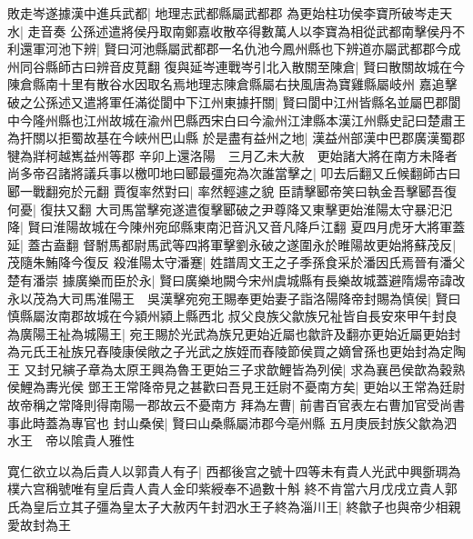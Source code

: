 敗走岑遂據漢中進兵武都|{
	地理志武都縣屬武都郡}
為更始柱功侯李寶所破岑走天水|{
	走音奏}
公孫述遣將侯丹取南鄭嘉收散卒得數萬人以李寶為相從武都南擊侯丹不利還軍河池下辨|{
	賢曰河池縣屬武都郡一名仇池今鳳州縣也下辨道亦屬武都郡今成州同谷縣師古曰辨音皮莧翻}
復與延岑連戰岑引北入散關至陳倉|{
	賢曰散關故城在今陳倉縣南十里有散谷水因取名焉地理志陳倉縣屬右抉風唐為寶雞縣屬岐州}
嘉追擊破之公孫述又遣將軍任滿從閬中下江州東據扞關|{
	賢曰閬中江州皆縣名並屬巴郡閬中今隆州縣也江州故城在渝州巴縣西宋白曰今渝州江津縣本漢江州縣史記曰楚肅王為扞關以拒蜀故基在今峽州巴山縣}
於是盡有益州之地|{
	漢益州部漢中巴郡廣漢蜀郡犍為牂柯越嶲益州等郡}
辛卯上還洛陽　三月乙未大赦　更始諸大將在南方未降者尚多帝召諸將議兵事以檄叩地曰郾最彊宛為次誰當擊之|{
	叩去后翻又丘候翻師古曰郾一戰翻宛於元翻}
賈復率然對曰|{
	率然輕遽之貌}
臣請擊郾帝笑曰執金吾擊郾吾復何憂|{
	復扶又翻}
大司馬當擊宛遂遣復擊郾破之尹尊降又東擊更始淮陽太守暴汜汜降|{
	賢曰淮陽故城在今陳州宛邱縣東南汜音汎又音凡降戶江翻}
夏四月虎牙大將軍蓋延|{
	蓋古盍翻}
督駙馬都尉馬武等四將軍擊劉永破之遂圍永於睢陽故更始將蘇茂反|{
	茂隨朱鮪降今復反}
殺淮陽太守潘蹇|{
	姓譜周文王之子季孫食采於潘因氏焉晉有潘父楚有潘崇}
據廣樂而臣於永|{
	賢曰廣樂地闕今宋州虞城縣有長樂故城蓋避隋煬帝諱改}
永以茂為大司馬淮陽王　吳漢擊宛宛王賜奉更始妻子詣洛陽降帝封賜為慎侯|{
	賢曰慎縣屬汝南郡故城在今潁州潁上縣西北}
叔父良族父歙族兄祉皆自長安來甲午封良為廣陽王祉為城陽王|{
	宛王賜於光武為族兄更始近屬也歙許及翻亦更始近屬更始封為元氏王祉族兄舂陵康侯敞之子光武之族姪而舂陵節侯買之嫡曾孫也更始封為定陶王}
又封兄縯子章為太原王興為魯王更始三子求歆鯉皆為列侯|{
	求為襄邑侯歆為穀熟侯鯉為夀光侯}
鄧王王常降帝見之甚歡曰吾見王廷尉不憂南方矣|{
	更始以王常為廷尉故帝稱之常降則得南陽一郡故云不憂南方}
拜為左曹|{
	前書百官表左右曹加官受尚書事此時蓋為專官也}
封山桑侯|{
	賢曰山桑縣屬沛郡今亳州縣}
五月庚辰封族父歙為泗水王　帝以隂貴人雅性

寛仁欲立以為后貴人以郭貴人有子|{
	西都後宫之號十四等未有貴人光武中興斵琱為樸六宫稱號唯有皇后貴人貴人金印紫綬奉不過數十斛}
終不肯當六月戊戌立貴人郭氏為皇后立其子彊為皇太子大赦丙午封泗水王子終為淄川王|{
	終歙子也與帝少相親愛故封為王}


